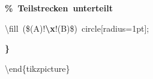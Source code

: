 {{\rule[-0.5ex]{0pt}{2.5ex}\hspace*{2.0em}\textcolor{G}{\textbf{\%~Teilstrecken~unterteilt}}\\
\rule[-0.5ex]{0pt}{2.5ex}\hspace*{2.0em}\textbackslash{}fill~(\$(A)!\textcolor{B}{\textbf{\textbackslash{}x}}!(B)\$)~circle[radius=1pt];\\
\rule[-0.5ex]{0pt}{2.5ex}\hspace*{1.0em}\textcolor{R}{\textbf{\}}}\\
\rule[-0.5ex]{0pt}{2.5ex}\hspace*{0.0em}\textbackslash{}end\{tikzpicture\}}%
}%
\endgroup
